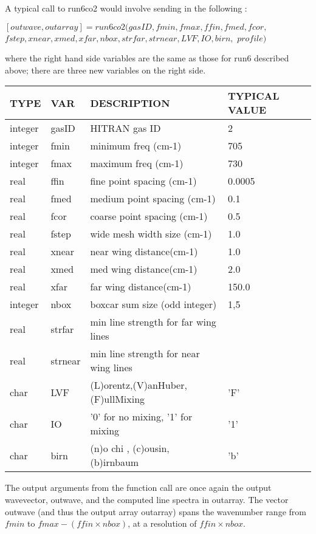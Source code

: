 \documentclass[11pt]{article}
\begin{document}
A typical call to run6co2 would involve sending in the following : 

$[outwave,outarray]=run6co2(gasID,fmin,fmax,ffin,fmed,fcor,$\\
              $fstep,xnear,xmed,xfar,nbox,strfar,strnear,LVF,IO,birn,$
              $profile)$

where the right hand side variables are the same as those for run6 
described above; there are three new variables on the right side.

\begin{longtable}{llll}
  TYPE  &   VAR  &         DESCRIPTION  &            TYPICAL VALUE\\
\hline
integer & gasID  &       HITRAN gas ID      &            2\\
\hline
integer & fmin    &      minimum freq (cm-1) &          705\\
integer & fmax    &      maximum freq (cm-1) &          730\\
\hline
real   &  ffin    &      fine point spacing (cm-1) &    0.0005\\
real   &  fmed    &      medium point spacing (cm-1)&   0.1\\
real   &  fcor    &      coarse point spacing (cm-1)  & 0.5\\
\hline
real   &  fstep   &      wide mesh width size (cm-1) &    1.0\\
real   &  xnear   &      near wing distance(cm-1)    &    1.0\\
real   &  xmed    &      med wing distance(cm-1)     &    2.0\\
real   &  xfar    &      far wing distance(cm-1)     &    150.0\\
\hline
integer & nbox     &     boxcar sum size (odd integer) &  1,5\\
\hline
real   &  strfar   &    min line strength for far wing lines & \\
real   &  strnear  &    min line strength for near wing lines& \\
\hline
char   &  LVF       &    (L)orentz,(V)anHuber,(F)ullMixing &  'F'\\
char   &  IO        &    '0' for no mixing, '1' for mixing &  '1'\\
char   &  birn      &    (n)o chi , (c)ousin, (b)irnbaum   &  'b'\\
\hline
\end{longtable}

The output arguments from the function call are once again the output 
wavevector, 
outwave, and the computed line spectra in outarray. The vector outwave (and 
thus the output array outarray) spans the wavenumber range from $fmin$ to 
$fmax-(ffin \times  nbox)$, at a resolution of $ffin \times nbox$.
\end{document}
